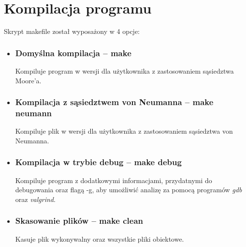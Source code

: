 \documentclass[11pt,a4paper]{report}
\begin{document}
\section{Kompilacja programu}
Skrypt makefile został wyposażony w 4 opcje:
\begin{itemize}
\item\subsubsection{Domyślna kompilacja -- make} Kompiluje program w wersji dla użytkownika z zastosowaniem sąsiedztwa Moore'a.
\item\subsubsection{Kompilacja z sąsiedztwem von Neumanna -- make neumann} Kompiluje plik w wersji dla użytkownika z zastosowaniem sąsiedztwa von Neumanna.
\item\subsubsection{Kompilacja w trybie debug -- make debug} Kompiluje program z dodatkowymi informacjami, przydatnymi do debugowania oraz flagą -g, aby umożliwić analizę za pomocą programów \textsl{gdb} oraz \textsl{valgrind}.
\item\subsubsection{Skasowanie plików -- make clean} Kasuje plik wykonywalny oraz wszystkie pliki obiektowe.
\end{itemize}
\newpage

\end{document}
